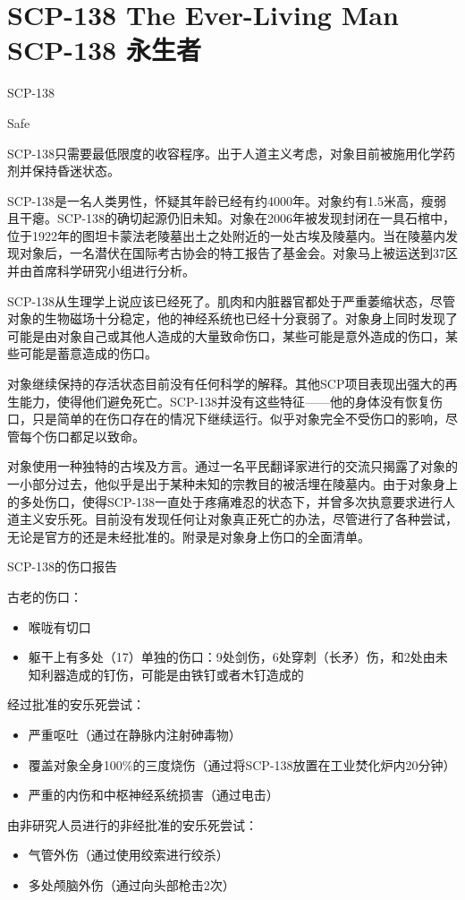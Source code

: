 \chapter[SCP-138 永生者]{
    SCP-138 The Ever-Living Man\\
    SCP-138 永生者
}

\label{chap:SCP-138}

SCP-138

Safe

SCP-138只需要最低限度的收容程序。出于人道主义考虑，对象目前被施用化学药剂并保持昏迷状态。

SCP-138是一名人类男性，怀疑其年龄已经有约4000年。对象约有1.5米高，瘦弱且干瘪。SCP-138的确切起源仍旧未知。对象在2006年被发现封闭在一具石棺中，位于1922年的图坦卡蒙法老陵墓出土之处附近的一处古埃及陵墓内。当在陵墓内发现对象后，一名潜伏在国际考古协会的特工报告了基金会。对象马上被运送到37区并由首席科学研究小组进行分析。

SCP-138从生理学上说应该已经死了。肌肉和内脏器官都处于严重萎缩状态，尽管对象的生物磁场十分稳定，他的神经系统也已经十分衰弱了。对象身上同时发现了可能是由对象自己或其他人造成的大量致命伤口，某些可能是意外造成的伤口，某些可能是蓄意造成的伤口。

对象继续保持的存活状态目前没有任何科学的解释。其他SCP项目表现出强大的再生能力，使得他们避免死亡。SCP-138并没有这些特征——他的身体没有恢复伤口，只是简单的在伤口存在的情况下继续运行。似乎对象完全不受伤口的影响，尽管每个伤口都足以致命。

对象使用一种独特的古埃及方言。通过一名平民翻译家进行的交流只揭露了对象的一小部分过去，他似乎是出于某种未知的宗教目的被活埋在陵墓内。由于对象身上的多处伤口，使得SCP-138一直处于疼痛难忍的状态下，并曾多次执意要求进行人道主义安乐死。目前没有发现任何让对象真正死亡的办法，尽管进行了各种尝试，无论是官方的还是未经批准的。附录是对象身上伤口的全面清单。

SCP-138的伤口报告

古老的伤口：

\begin{itemize}
\item 喉咙有切口
\item 躯干上有多处（17）单独的伤口：9处剑伤，6处穿刺（长矛）伤，和2处由未知利器造成的钉伤，可能是由铁钉或者木钉造成的
\end{itemize}

经过批准的安乐死尝试：

\begin{itemize}
\item 严重呕吐（通过在静脉内注射砷毒物）
\item 覆盖对象全身100\%的三度烧伤（通过将SCP-138放置在工业焚化炉内20分钟）
\item 严重的内伤和中枢神经系统损害（通过电击）
\end{itemize}

由非研究人员进行的非经批准的安乐死尝试：

\begin{itemize}
\item 气管外伤（通过使用绞索进行绞杀）
\item 多处颅脑外伤（通过向头部枪击2次）
\end{itemize}
